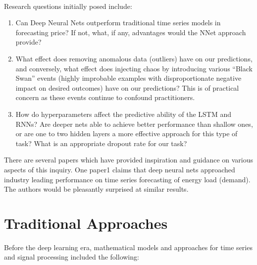 \documentclass{article}
\begin{document}
\paragraph{}
Research questions initially posed include:
\begin{enumerate}
    \item Can Deep Neural Nets outperform traditional time series models in forecasting price? If not, what, if any, advantages would the NNet approach provide?
    \item What effect does removing anomalous data (outliers) have on our predictions, and conversely, what effect does injecting chaos by introducing various “Black Swan” events (highly improbable examples with disproportionate negative impact on desired outcomes) have on our predictions? This is of practical concern as these events continue to confound practitioners.
    \item How do hyperparameters affect the predictive ability of the LSTM and RNNs? Are deeper nets able to achieve better performance than shallow ones, or are one to two hidden layers a more effective approach for this type of task? What is an appropriate dropout rate for our task?
\end{enumerate}

There are several papers which have provided inspiration and guidance on various aspects of this inquiry. One paper1 claims that deep neural nets approached industry leading performance on time series forecasting of energy load (demand). The authors would be pleasantly surprised at similar results.

\section{Traditional Approaches}
\paragraph{}
Before the deep learning era, mathematical models and approaches for time series and signal processing included the following:
\end{document}
